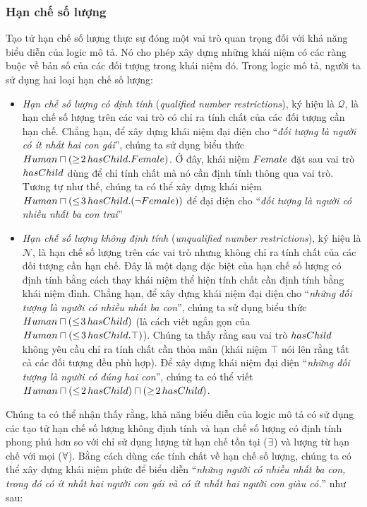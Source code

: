 \subsubsection{Hạn chế số lượng}
\label{sec:Chap1.NumberRestrictions}
Tạo tử hạn chế số lượng thực sự đóng một vai trò quan trọng đối với khả năng biểu diễn của logic mô tả. Nó cho phép xây dựng những khái niệm có các ràng buộc về bản số của các đối tượng trong khái niệm đó.
Trong logic mô tả, người ta sử dụng hai loại hạn chế số lượng:
\begin{itemize}
	\item {\em Hạn chế số lượng có định tính} ({\em qualified number restrictions}), ký hiệu là $\mathcal{Q}$, là hạn chế số lượng trên các vai trò có chỉ ra tính chất của các đối tượng cần hạn chế.
	Chẳng hạn, để xây dựng khái niệm đại diện cho ``\textit{đối tượng là người có ít nhất hai con gái}'', chúng ta sử dụng biểu thức $Human \sqcap (\geq\!2\,hasChild.Female)$. Ở đây, khái niệm $Female$ đặt sau vai trò $hasChild$ dùng để chỉ tính chất mà nó cần định tính thông qua vai trò. Tương tự như thế, chúng ta có thể xây dựng khái niệm $Human \sqcap (\leq\!3\,hasChild.(\neg Female))$ để đại diện cho ``\textit{đối tượng là người có nhiều nhất ba con trai}''
	
	\item {\em Hạn chế số lượng không định tính} ({\em unqualified number restrictions}), ký hiệu là $\mathcal{N}$, là hạn chế số lượng trên các vai trò nhưng không chỉ ra tính chất của các đối tượng cần hạn chế. Đây là một dạng đặc biệt của hạn chế số lượng có định tính bằng cách thay khái niệm thể hiện tính chất cần định tính bằng khái niệm đỉnh.
	Chẳng hạn, để xây dựng khái niệm đại diện cho ``\textit{những đối tượng là người có nhiều nhất ba con}'', chúng ta sử dụng biểu thức $Human \sqcap (\leq\!3\,hasChild)$ (là cách viết ngắn gọn của $Human \sqcap (\leq\!3\,hasChild.\top)$). Chúng ta thấy rằng sau vai trò $hasChild$ không yêu cầu chỉ ra tính chất cần thỏa mãn (khái niệm $\top$ nói lên rằng tất cả các đối tượng đều phù hợp). Để xây dựng khái niệm đại diện ``\textit{những đối tượng là người có đúng hai con}'', chúng ta có thể viết $Human \sqcap (\leq\!2\,hasChild) \sqcap (\geq\!2\,hasChild)$.
\end{itemize}

Chúng ta có thể nhận thấy rằng, khả năng biểu diễn của logic mô tả có sử dụng các tạo tử hạn chế số lượng không định tính và hạn chế số lượng có định tính phong phú hơn so với chỉ sử dụng lượng từ hạn chế tồn tại ($\exists$) và lượng từ hạn chế với mọi ($\forall$). Bằng cách dùng các tính chất về hạn chế số lượng, chúng ta có thể xây dựng khái niệm phức để biểu diễn ``{\em những người có nhiều nhất ba con, trong đó có ít nhất hai người con gái và có ít nhất hai người con giàu có.}'' như sau:

